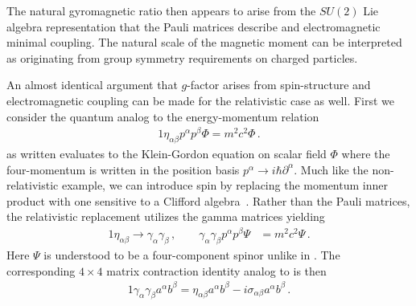 The natural gyromagnetic ratio then appears to arise from the $SU(2)$ Lie algebra representation that the Pauli matrices describe and electromagnetic minimal coupling. The natural scale of the magnetic moment can be interpreted as originating from group symmetry requirements on charged particles.

An almost identical argument that $g$-factor arises from spin-structure and electromagnetic coupling can be made for the relativistic case as well. First we consider the quantum analog to the energy-momentum relation
\begin{alignat}{1}
	\label{analog:1} \eta_{\alpha\beta}p^{\alpha}p^{\beta}\Phi=m^{2}c^{2}\Phi\,.
\end{alignat}
 as written evaluates to the Klein-Gordon equation on scalar field $\Phi$ where the four-momentum is written in the position basis $p^{\alpha}\rightarrow i\hbar\partial^{\alpha}$. Much like the non-relativistic example, we can introduce spin by replacing the momentum inner product with one sensitive to a Clifford algebra~\citep{Weinberg:1995mt}. Rather than the Pauli matrices, the relativistic replacement utilizes the gamma matrices yielding
\begin{alignat}{1}
	\label{eq:spin:03}
    \eta_{\alpha\beta}\rightarrow\gamma_{\alpha}\gamma_{\beta}\,,\qquad
    \gamma_{\alpha}\gamma_{\beta}p^{\alpha}p^{\beta}\Psi&=m^{2}c^{2}\Psi\,.
\end{alignat}
Here $\Psi$ is understood to be a four-component spinor unlike in . The corresponding $4\times4$ matrix contraction identity analog to  is then
\begin{alignat}{1}
	\label{eq:spin:04} \gamma_{\alpha}\gamma_{\beta}a^{\alpha}b^{\beta}=\eta_{\alpha\beta}a^{\alpha}b^{\beta}-i\sigma_{\alpha\beta}a^{\alpha}b^{\beta}\,.
\end{alignat}

